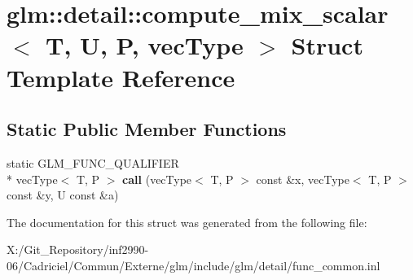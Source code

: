 \hypertarget{structglm_1_1detail_1_1compute__mix__scalar}{\section{glm\-:\-:detail\-:\-:compute\-\_\-mix\-\_\-scalar$<$ T, U, P, vec\-Type $>$ Struct Template Reference}
\label{structglm_1_1detail_1_1compute__mix__scalar}
}
\subsection*{Static Public Member Functions}
\begin{DoxyCompactItemize}
\item 
\hypertarget{structglm_1_1detail_1_1compute__mix__scalar_a15fb89e5dac67f6645419fd7eaebdc5f}{static G\-L\-M\-\_\-\-F\-U\-N\-C\-\_\-\-Q\-U\-A\-L\-I\-F\-I\-E\-R \\*
vec\-Type$<$ T, P $>$ {\bfseries call} (vec\-Type$<$ T, P $>$ const \&x, vec\-Type$<$ T, P $>$ const \&y, U const \&a)}\label{structglm_1_1detail_1_1compute__mix__scalar_a15fb89e5dac67f6645419fd7eaebdc5f}

\end{DoxyCompactItemize}


The documentation for this struct was generated from the following file\-:\begin{DoxyCompactItemize}
\item 
X\-:/\-Git\-\_\-\-Repository/inf2990-\/06/\-Cadriciel/\-Commun/\-Externe/glm/include/glm/detail/func\-\_\-common.\-inl\end{DoxyCompactItemize}
